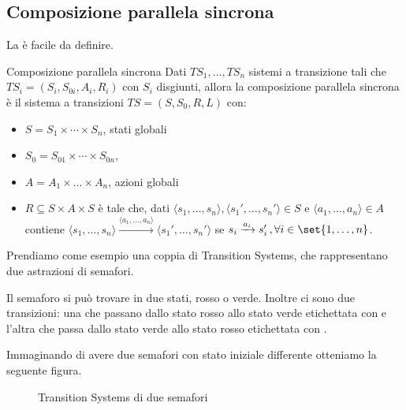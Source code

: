\subsection{Composizione parallela sincrona}
La  è facile da definire.

\begin{definition}{Composizione parallela sincrona}
  Dati \(TS_1, \ldots, TS_n\) sistemi a transizione tali che \(TS_i = (S_i, S_{0i}, A_i, R_i)\) con \(S_i\) disgiunti, allora la composizione parallela sincrona è il sistema a transizioni \(TS = (S,S_0,R,L)\) con:
  \begin{itemize}
    \item \(S = S_1 \times \cdots \times S_n\), stati globali
    \item \(S_0 = S_{01} \times \cdots \times S_{0n}\),
    \item \(A = A_1 \times \ldots \times A_n\), azioni globali
    \item \(R \subseteq S \times A \times S\) è tale che, dati \(\langle s_1, \ldots, s_n\rangle, \langle s_1', \ldots, s_n'\rangle \in S\) e \(\langle a_1,\ldots, a_n \rangle \in A\) contiene \(\langle s_1,\ldots,s_n \rangle \xrightarrow{\langle a_1,\ldots,a_n \rangle} \langle s_1',\ldots,s_n'\rangle\) se \(s_i \xrightarrow{a_i} s_i'\,, \forall i \in \set{1,\ldots,n}\).
  \end{itemize}
\end{definition}

Prendiamo come esempio una coppia di Transition Systems, che rappresentano due astrazioni di semafori.

Il semaforo si può trovare in due stati, rosso o verde. Inoltre ci sono due transizioni: una che passano dallo stato rosso allo stato verde etichettata con  e l'altra che passa dallo stato verde allo stato rosso etichettata con .

Immaginando di avere due semafori con stato iniziale differente otteniamo la seguente figura.

\begin{figure}[H]
  \centering
  \caption{Transition Systems di due semafori}\label{fig:ts_semaphore}
\end{figure}

